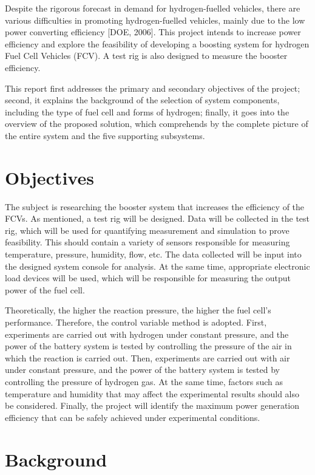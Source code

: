 \documentclass[a4paper,11pt]{article}
\begin{document}
Despite the rigorous forecast in demand for hydrogen-fuelled vehicles, there are various difficulties in promoting hydrogen-fuelled vehicles, mainly due to the low power converting efficiency [DOE, 2006]. This project intends to increase power efficiency and explore the feasibility of developing a boosting system for hydrogen Fuel Cell Vehicles (FCV). A test rig is also designed to measure the booster efficiency. 

This report first addresses the primary and secondary objectives of the project; second, it explains the background of the selection of system components, including the type of fuel cell and forms of hydrogen; finally, it goes into the overview of the proposed solution, which comprehends by the complete picture of the entire system and the five supporting subsystems.

\section{Objectives}

The subject is researching the booster system that increases the efficiency of the FCVs. As mentioned, a test rig will be designed. Data will be collected in the test rig, which will be used for quantifying measurement and simulation to prove feasibility. This should contain a variety of sensors responsible for measuring temperature, pressure, humidity, flow, etc. The data collected will be input into the designed system console for analysis. At the same time, appropriate electronic load devices will be used, which will be responsible for measuring the output power of the fuel cell.

Theoretically, the higher the reaction pressure, the higher the fuel cell's performance. Therefore, the control variable method is adopted. First, experiments are carried out with hydrogen under constant pressure, and the power of the battery system is tested by controlling the pressure of the air in which the reaction is carried out. Then, experiments are carried out with air under constant pressure, and the power of the battery system is tested by controlling the pressure of hydrogen gas. At the same time, factors such as temperature and humidity that may affect the experimental results should also be considered. Finally, the project will identify the maximum power generation efficiency that can be safely achieved under experimental conditions.

\section{Background}
\end{document}
